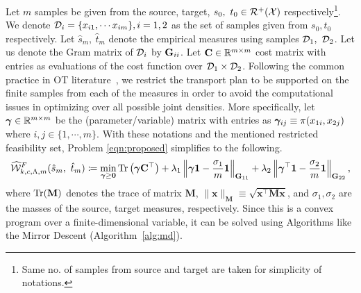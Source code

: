 Let $m$ samples be given from the source, target, $s_0,~t_0\in\mathcal{R}^+(\mathcal{X})$ respectively\footnote{Same no. of samples from source and target are taken for simplicity of notations.}. We denote $\mathcal{D}_i=\{x_{i1}, \cdots x_{im}\}, i=1,2$ as the set of samples given from $s_0,t_0$ respectively. Let $\hat{s}_m,\ \hat{t}_m$ denote the empirical measures using samples $\mathcal{D}_1,\ \mathcal{D}_2$. Let us denote the Gram matrix of $\mathcal{D}_i$ by $\mathbf{G}_{ii}$. Let $\mathbf{C}\in \mathbb{R}^{m\times m}$ cost matrix with entries as evaluations of the cost function over $\mathcal{D}_1\times\mathcal{D}_2$. Following the common practice in OT literature~\citep{ChizatPSV18,cuturi13a,damodaran2018deepjdot,jumbot,RSOT,ROT,ot-kme,peyre2019computational}, we restrict the transport plan to be supported on the finite samples from each of the measures in order to avoid the computational issues in optimizing over all possible joint densities. More specifically, let $\bm{\gamma} \in \mathbb{R}^{m\times m}$ be the (parameter/variable) matrix with entries as $\bm{\gamma}_{ij}\equiv\pi(x_{1i},x_{2j})$ where $i,j\in \{1, \cdots, m\}$. With these notations and the mentioned restricted feasibility set, Problem \ref{eqn:proposed} simplifies to the following.
\begin{equation}\label{eqn:kernotinit}
\widehat{\mathcal{W}}^F_{k, c, \Lambda, m}(\hat{s}_m,\ \hat{t}_m)\coloneqq \min\limits_{\bm{\gamma}\ge\mathbf{0}} \textup{Tr}\left(\bm{\gamma}\mathbf{C}^\top\right) + \lambda_1\left\Vert\bm{\gamma}\mathbf{1}-\frac{\sigma_1}{m}\mathbf{1}\right\Vert_{\mathbf{G}_{11}}+\lambda_2\left\Vert\bm{\gamma}^\top\mathbf{1}-\frac{\sigma_2}{m}\mathbf{1}\right\Vert_{\mathbf{G}_{22}},
\end{equation}
where $\textup{Tr}(\mathbf{M})$ denotes the trace of matrix $\mathbf{M}$, $\|\mathbf{x}\|_\mathbf{M}\equiv \sqrt{\mathbf{x}^\top \mathbf{M}\mathbf{x}}$, and $\sigma_1,\sigma_2$ are the masses of the source, target measures, respectively. Since this is a convex program over a finite-dimensional variable, it can be solved using Algorithms like the Mirror Descent (Algorithm~\ref{alg:md}).

